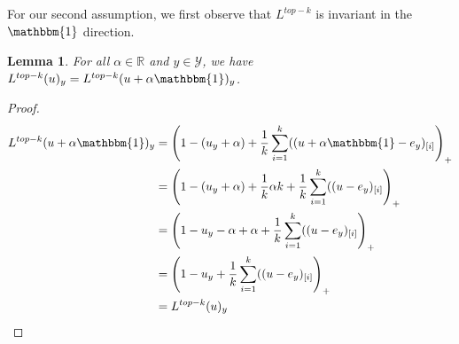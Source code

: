 \documentclass[12pt]{article}
\newcommand{\reals}{\mathbb{R}}
\newcommand{\Y}{\mathcal{Y}}
\newcommand{\ones}{\mathbbm{1}}
\newtheorem{lemma}{Lemma}
\begin{document}
For our second assumption, we first observe that $L^{top-k}$ is invariant in the $\ones$ direction.
\begin{lemma}
	For all $\alpha \in \reals$ and $y\in\Y$, we have $L^{top-k}(u)_y = L^{top-k}(u + \alpha \ones)_y$.
\end{lemma}
\begin{proof}\label{lem:invar-ones}
	\begin{align*}
	L^{top-k}(u + \alpha \ones)_y &= \left(1 - (u_y + \alpha) + \frac{1}{k} \sum_{i=1}^k ((u + \alpha \ones  - e_y)_{[i]} \right)_+\\
	&= \left(1 - (u_y + \alpha) +\frac{1}{k} \alpha k + \frac{1}{k} \sum_{i=1}^k ((u - e_y)_{[i]} \right)_+\\
	&= \left(1 -u_y - \alpha + \alpha + \frac{1}{k} \sum_{i=1}^k ((u - e_y)_{[i]} \right)_+\\
	&= \left(1 -u_y + \frac{1}{k} \sum_{i=1}^k ((u - e_y)_{[i]} \right)_+\\
	&= L^{top-k}(u)_y
	\end{align*}
\end{proof}
\end{document}
